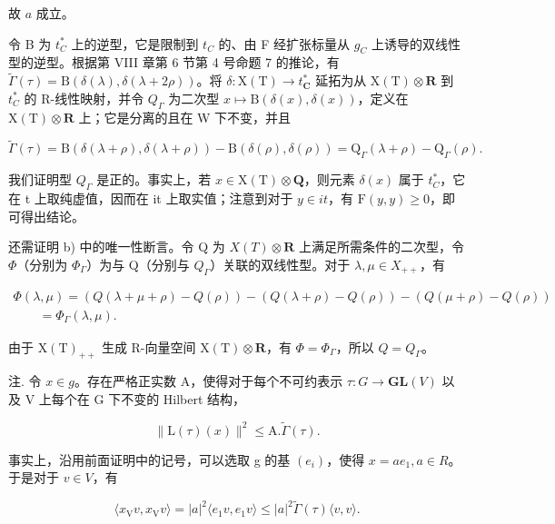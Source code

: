 故 \(a\) 成立。

令 B 为 \(t_{C}^{*}\) 上的逆型，它是限制到 \(t_{C}\) 的、由 F 经扩张标量从 \(g_{C}\) 上诱导的双线性型的逆型。根据第 VIII 章第 6 节第 4 号命题 7 的推论，有 \(\tilde{\Gamma}(\tau) = \mathrm{B}(\delta(\lambda), \delta(\lambda + 2\rho))\)。将 \(\delta : \mathrm{X(T)} \to t_{\mathbf{C}}^{*}\) 延拓为从 \(\mathrm{X(T)} \otimes \mathbf{R}\) 到 \(t_{C}^{*}\) 的 R-线性映射，并令 \(Q_{\Gamma}\) 为二次型 \(x \mapsto \mathrm{B}(\delta(x), \delta(x))\)，定义在 \(\mathrm{X(T)} \otimes \mathbf{R}\) 上；它是分离的且在 W 下不变，并且

\[
\tilde {\Gamma} (\tau) = \mathrm{B} (\delta (\lambda + \rho), \delta (\lambda + \rho)) - \mathrm{B} (\delta (\rho), \delta (\rho)) = \mathrm{Q} _ {\Gamma} (\lambda + \rho) - \mathrm{Q} _ {\Gamma} (\rho).
\]

我们证明型 \(Q_{\Gamma}\) 是正的。事实上，若 \(x \in \mathrm{X}(\mathrm{T}) \otimes \mathbf{Q}\)，则元素 \(\delta(x)\) 属于 \(t_{C}^{*}\)，它在 t 上取纯虚值，因而在 it 上取实值；注意到对于 \(y \in it\)，有 \(\mathrm{F}(y, y) \geq 0\)，即可得出结论。

还需证明 b) 中的唯一性断言。令 Q 为 \(X(T) \otimes \mathbf{R}\) 上满足所需条件的二次型，令 \(\Phi\)（分别为 \(\Phi_{\Gamma}\)）为与 Q（分别与 \(Q_{\Gamma}\)）关联的双线性型。对于 \(\lambda, \mu \in X_{++}\)，有

\[
\begin{array}{l} \Phi (\lambda , \mu) = (Q (\lambda + \mu + \rho) - Q (\rho)) - (Q (\lambda + \rho) - Q (\rho)) - (Q (\mu + \rho) - Q (\rho)) \\ \qquad = \Phi_ {\Gamma} (\lambda , \mu). \end{array}
\]

由于 \(\mathrm{X(T)_{++}}\) 生成 R-向量空间 \(\mathrm{X(T)}\otimes\mathbf{R}\)，有 \(\Phi=\Phi_{\Gamma}\)，所以 \(Q=Q_{\Gamma}\)。

注. 令 \(x \in g\)。存在严格正实数 A，使得对于每个不可约表示 \(\tau : G \to \mathbf{GL}(V)\) 以及 V 上每个在 G 下不变的 Hilbert 结构，

\[
\| \mathrm{L} (\tau) (x) \| ^ {2} \leq \mathrm{A}. \tilde {\Gamma} (\tau).
\]

事实上，沿用前面证明中的记号，可以选取 g 的基 \((e_{i})\)，使得 \(x = ae_{1}, a \in R\)。于是对于 \(v \in V\)，有

\[
\langle x _ {\mathrm{V}} v, x _ {\mathrm{V}} v \rangle = | a | ^ {2} \langle e _ {1} v, e _ {1} v \rangle \leq | a | ^ {2} \tilde {\Gamma} (\tau) \langle v, v \rangle .
\]

